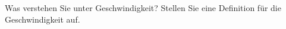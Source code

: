 \begin{aufgabe}
Was verstehen Sie unter Geschwindigkeit?
Stellen Sie eine Definition für die Geschwindigkeit auf.
\end{aufgabe}


